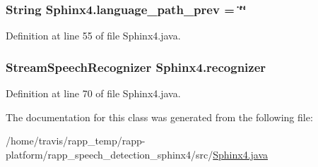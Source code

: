 \hypertarget{classSphinx4_a675a26a3e9ac32594d217547be5ca7f6}{
\subsubsection[{language\-\_\-path\-\_\-prev}]{\setlength{\rightskip}{0pt plus 5cm}String Sphinx4.\-language\-\_\-path\-\_\-prev = \char`\"{}\char`\"{}\hspace{0.3cm}{\ttfamily [static]}}}\label{classSphinx4_a675a26a3e9ac32594d217547be5ca7f6}


Definition at line 55 of file Sphinx4.\-java.

\hypertarget{classSphinx4_a232118ec001bbb6fe7def78e9592ef9b}{
\subsubsection[{recognizer}]{\setlength{\rightskip}{0pt plus 5cm}Stream\-Speech\-Recognizer Sphinx4.\-recognizer\hspace{0.3cm}{\ttfamily [static]}}}\label{classSphinx4_a232118ec001bbb6fe7def78e9592ef9b}


Definition at line 70 of file Sphinx4.\-java.



The documentation for this class was generated from the following file\-:\begin{DoxyCompactItemize}
\item 
/home/travis/rapp\-\_\-temp/rapp-\/platform/rapp\-\_\-speech\-\_\-detection\-\_\-sphinx4/src/\hyperlink{Sphinx4_8java}{Sphinx4.\-java}\end{DoxyCompactItemize}
